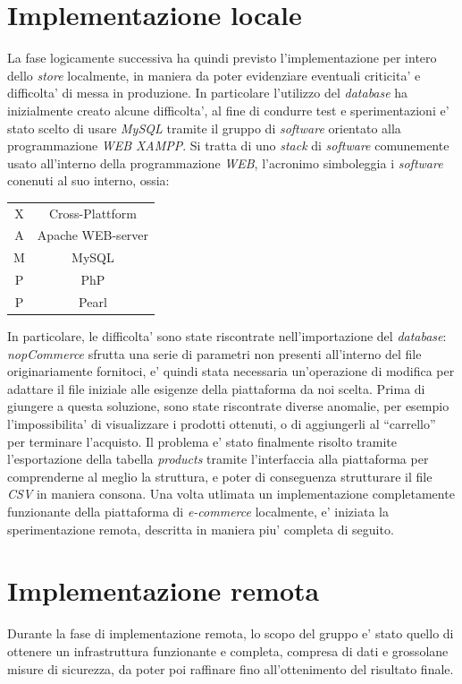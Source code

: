 \documentclass[a4paper]{report}
\newcommand{\quotes}[1]{``#1''}
\begin{document}
	\section{Implementazione locale}\label{implementazione_locale}
		La fase logicamente successiva ha quindi previsto l'implementazione per intero dello \emph{store} localmente,
		in maniera da poter evidenziare eventuali criticita' e difficolta' di messa in produzione. In particolare
		l'utilizzo del \emph{database} ha inizialmente creato alcune difficolta', al fine di condurre test e
		sperimentazioni e' stato scelto di usare \emph{MySQL} tramite il gruppo di \emph{software} orientato alla
		programmazione \emph{WEB} \emph{XAMPP}. Si tratta di uno \emph{stack} di \emph{software} comunemente usato
		all'interno della programmazione \emph{WEB}, l'acronimo simboleggia i \emph{software} conenuti al suo interno,
		ossia:
		\begin{center}
			\begin{tabular}{c c}
				X & Cross-Plattform \\
				A & Apache WEB-server \\
				M & MySQL \\
				P & PhP \\
				P & Pearl \\
			\end{tabular}
		\end{center}
		In particolare, le difficolta' sono state riscontrate nell'importazione del \emph{database}: \emph{nopCommerce}
		sfrutta una serie di parametri non presenti all'interno del file originariamente fornitoci, e' quindi stata
		necessaria un'operazione di modifica per adattare il file iniziale alle esigenze della piattaforma da noi
		scelta.
		Prima di giungere a questa soluzione, sono state riscontrate diverse anomalie, per esempio l'impossibilita' di
		visualizzare i prodotti ottenuti, o di aggiungerli al \quotes{carrello} per terminare l'acquisto.
		Il problema e' stato finalmente risolto tramite l'esportazione della tabella \emph{products} tramite
		l'interfaccia alla piattaforma per comprenderne al meglio la struttura, e poter di conseguenza strutturare il
		file \emph{CSV} in maniera consona.
		Una volta utlimata un implementazione completamente funzionante della piattaforma di \emph{e-commerce}
		localmente, e' iniziata la sperimentazione remota, descritta in maniera piu' completa di seguito.
	 \section{Implementazione remota}\label{implementazione_remota}
		Durante la fase di implementazione remota, lo scopo del gruppo e' stato quello di ottenere un infrastruttura
		funzionante e completa, compresa di dati e grossolane misure di sicurezza, da poter poi raffinare fino
		all'ottenimento del risultato finale.
\end{document}
